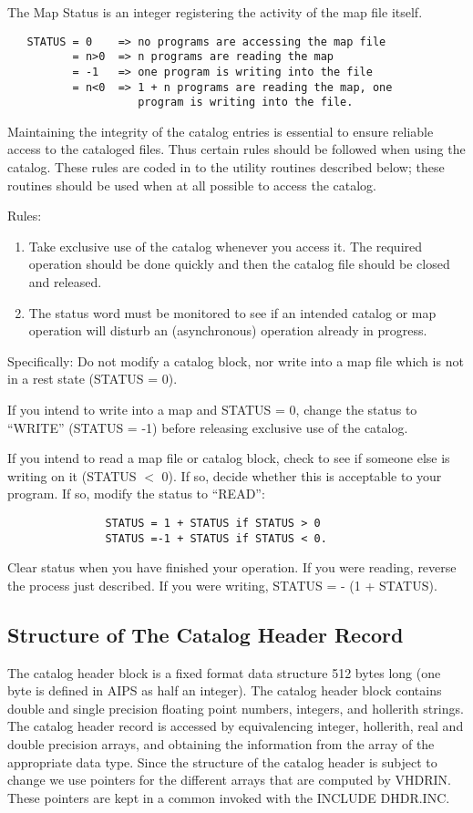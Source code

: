 The Map Status is an integer registering the activity of the map
file itself.
\begin{verbatim}
   STATUS = 0    => no programs are accessing the map file
          = n>0  => n programs are reading the map
          = -1   => one program is writing into the file
          = n<0  => 1 + n programs are reading the map, one
                    program is writing into the file.

\end{verbatim}
Maintaining the integrity of the catalog entries is essential to
ensure reliable access to the cataloged files.  Thus certain rules
should be followed when using the catalog.  These rules are coded in
to the utility routines described below; these routines should be used
when at all possible to access the catalog.

Rules:
\begin{enumerate}
\item Take exclusive use of the catalog whenever you access it.
The required operation should be done quickly and then
the catalog file should be closed and released.
\item The status word must be monitored to see if an intended
catalog or map operation will disturb an (asynchronous)
operation already in progress.
\end{enumerate}
Specifically:  Do not modify a catalog block, nor write into a
map file which is not in a rest state (STATUS = 0).

If you intend to write into a map and STATUS = 0, change the status to
``WRITE'' (STATUS = -1) before releasing exclusive use of the catalog.

If you intend to read a map file or catalog block, check to see if
someone else is writing on it (STATUS $<$ 0).  If so, decide whether
this is acceptable to your program.  If so, modify the status to
``READ'':
\begin{verbatim}
               STATUS = 1 + STATUS if STATUS > 0
               STATUS =-1 + STATUS if STATUS < 0.
\end{verbatim}
Clear status when you have finished your operation.  If you were
reading, reverse the process just described.  If you were writing,
STATUS = - (1 + STATUS).


\subsection{Structure of The Catalog Header Record}
The catalog header block is a fixed format data structure 512 bytes
long (one byte is defined in AIPS as half an integer). The catalog
header block contains double and single precision floating point
numbers, integers, and hollerith strings.  The catalog header record
is accessed by equivalencing integer, hollerith, real and double
precision arrays, and obtaining the information from the array of the
appropriate data type.  Since the structure of the catalog header is
subject to change we use pointers for the different
arrays that are computed by VHDRIN.  These pointers are kept in a
common invoked with the INCLUDE DHDR.INC.

